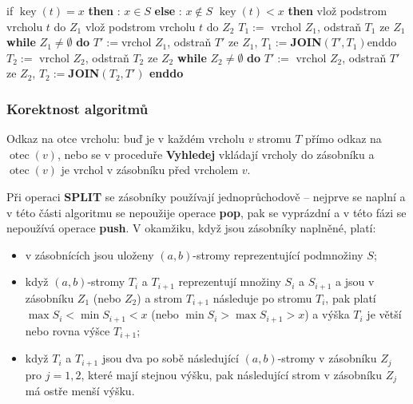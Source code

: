 \documentclass[a4paper,12pt]{article}
\DeclareMathOperator*{\otec}{otec}
\DeclareMathOperator*{\key}{key}
\begin{document}
{{\textsf{if}} $\key(t)=x$ {\bf \textsf{then}}\newline 
\phantom{---}{\bf Výstup}: $x\in S$\newline 
{\bf \textsf{else}}\newline 
\phantom{---}{\bf Výstup}: $x\notin S$\newline 
{} $\key(t)<x$ {\bf \textsf{then}}\newline 
\phantom{------}vlož podstrom vrcholu $t$ \textsf{do} $Z_1$\newline 
{}\newline 
\phantom{------}vlož podstrom vrcholu $t$ \textsf{do} $Z_2$\newline 
{}\newline 
$T_1:=\text{ vrchol }Z_1$, odstraň $T_1$ ze $Z_1$\newline 
{\bf \textsf{while}} $Z_1\ne\emptyset$ {\bf \textsf{do}}\newline 
\phantom{---}$T':=$vrchol $Z_1$, odstraň $T'$ ze $Z_1$, $T_1:=${\bf JOIN}$(T',T_1)$\newline \textsf{enddo}\newline 
$T_2:=\text{ vrchol }Z_2$, odstraň $T_2$ ze $Z_2$\newline 
{\bf \textsf{while}} $Z_2\ne\emptyset$ {\bf \textsf{do}}\newline 
$T':=\text{ vrchol }Z_2$, odstraň $T'$ ze $Z_2$, $T_2:=${\bf JOIN$(T_2,T')$\newline 
\textsf{enddo}}
}

\subsubsection{Korektnost algoritmů}

Odkaz na otce vrcholu: buď je v každém vrcholu $v$ 
stromu $T$ přímo odkaz na $\otec(v)$, nebo se v proceduře 
{\bf Vyhledej} vkláda\-jí vrcholy do zásobníku a $\otec
(v)$ 
je vrchol v zásobníku před vrcholem $v$.

Při operaci {\bf SPLIT} se zásobníky používají 
jednoprůchodově -- nejprve se naplní a v této části 
algoritmu se nepoužije operace {\bf pop}, pak se vyprázdní a v této 
fázi se nepoužívá operace {\bf push}. V okamžiku, když jsou 
zásobníky naplněné, platí:
\begin{itemize}
\item
v zásobnících jsou uloženy $(a,b)$-stromy reprezentující 
podmnožiny $S$;
\item 
když $(a,b)$-stromy $T_i$ a $T_{i+1}$ reprezentují množiny $S_
i$ a $S_{i+1}$ a jsou v zá\-sobníku $Z_1$ (nebo $Z_2$) a strom $T_{i+1}$ následuje 
po stromu $T_{i}$, pak platí $\max S_i<\min S_{i+1}<x$ (nebo 
$\min S_i>\max S_{i+1}>x$) a výška $T_i$ je větší nebo 
rovna výšce $T_{i+1}$;
\item
když $T_i$ a $T_{i+1}$ jsou dva po sobě následující $
(a,b)$-stromy v 
zásobníku $Z_j$ pro $j=1,2$, které mají stejnou výšku, pak 
následující strom v zásobníku $Z_j$ má ostře menší výšku.
\end{itemize}
\end{document}
